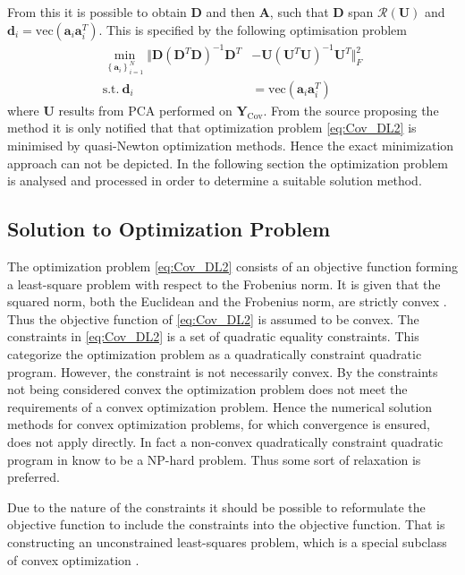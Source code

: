 From this it is possible to obtain $\mathbf{D}$ and then $\mathbf{A}$, such that $\mathbf{D}$ span $\mathcal{R}(\mathbf{U})$ and $\mathbf{d}_i = \text{vec}(\mathbf{a}_i \mathbf{a}_i^T)$. 
This is specified by the following optimisation problem \cite{Balkan2015}
\begin{align}
\min_{\left\{\mathbf{a}_i\right\}_{i = 1}^{N}}\Vert  \mathbf{D}(\mathbf{D}^T \mathbf{D})^{-1} \mathbf{D}^T &- \mathbf{U}(\mathbf{U}^T \mathbf{U})^{-1}\mathbf{U}^T \Vert_{F}^{2} \nonumber \\
\text{s.t.} \ \mathbf{d}_i &= \text{vec}(\mathbf{a}_i \mathbf{a}_i^T)\label{eq:Cov_DL2}
\end{align}      
where $\mathbf{U}$ results from PCA performed on $\textbf{Y}_{\text{Cov}}$.
From the source \cite{Balkan2015} proposing the method it is only notified that that optimization problem \eqref{eq:Cov_DL2} is minimised by quasi-Newton optimization methods. Hence the exact minimization approach can not be depicted.    
In the following section the optimization problem is analysed and processed in order to determine a suitable solution method. 
 
\subsection{Solution to Optimization Problem}
The optimization problem \eqref{eq:Cov_DL2} consists of an objective function forming a least-square problem with respect to the Frobenius norm. It is given that the squared norm, both the Euclidean and the Frobenius norm, are strictly convex \cite[p.173]{norm_optimization}.
Thus the objective function of \eqref{eq:Cov_DL2} is assumed to be convex.
The constraints in \eqref{eq:Cov_DL2} is a set of quadratic equality constraints. 
This categorize the optimization problem as a quadratically constraint quadratic program. 
However, the constraint is not necessarily convex.  
By the constraints not being considered convex the optimization problem does not meet the requirements of a convex optimization problem. Hence the numerical solution methods for convex optimization problems, for which convergence is ensured, does not apply directly. In fact a non-convex quadratically constraint quadratic program in know to be a NP-hard problem\cite{qcqp}. Thus some sort of relaxation is preferred.  

Due to the nature of the constraints it should be possible to reformulate the objective function to include the constraints into the objective function. That is constructing an unconstrained least-squares problem, which is a special subclass of convex optimization \cite{cvxbook}.

